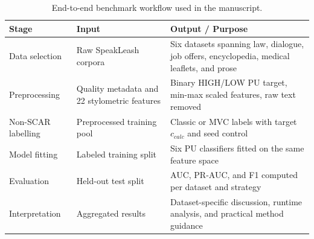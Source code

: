 \documentclass[applsci,article,submit,pdftex,moreauthors]{Definitions/mdpi}
\begin{document}
\begin{table}[t]
\centering
\caption{End-to-end benchmark workflow used in the manuscript.}
\label{tab:workflow_summary}
\small
\begin{tabularx}{\textwidth}{l>{\raggedright\arraybackslash}X>{\raggedright\arraybackslash}X}
\toprule
\textbf{Stage} & \textbf{Input} & \textbf{Output / Purpose} \\
\midrule
Data selection & Raw SpeakLeash corpora & Six datasets spanning law, dialogue, job offers, encyclopedia, medical leaflets, and prose \\
Preprocessing & Quality metadata and 22 stylometric features & Binary HIGH/LOW PU target, min-max scaled features, raw text removed \\
Non-SCAR labelling & Preprocessed training pool & Classic or MVC labels with target $c_{calc}$ and seed control \\
Model fitting & Labeled training split & Six PU classifiers fitted on the same feature space \\
Evaluation & Held-out test split & AUC, PR-AUC, and F1 computed per dataset and strategy \\
Interpretation & Aggregated results & Dataset-specific discussion, runtime analysis, and practical method guidance \\
\bottomrule
\end{tabularx}
\end{table}
\end{document}

